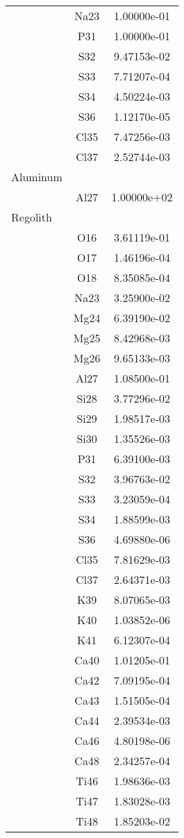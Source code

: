 \begin{centering}
\begin{longtable}{l c c}
& Na23 & 1.00000e-01 \\ 
& P31 & 1.00000e-01 \\ 
& S32 & 9.47153e-02 \\ 
& S33 & 7.71207e-04 \\ 
& S34 & 4.50224e-03 \\ 
& S36 & 1.12170e-05 \\ 
& Cl35 & 7.47256e-03 \\ 
& Cl37 & 2.52744e-03 \\ 
\hline
Aluminum & & \\
\hline
& Al27 & 1.00000e+02 \\ 
\hline
Regolith & & \\
\hline
& O16 & 3.61119e-01 \\ 
& O17 & 1.46196e-04 \\ 
& O18 & 8.35085e-04 \\ 
& Na23 & 3.25900e-02 \\ 
& Mg24 & 6.39190e-02 \\ 
& Mg25 & 8.42968e-03 \\ 
& Mg26 & 9.65133e-03 \\ 
& Al27 & 1.08500e-01 \\ 
& Si28 & 3.77296e-02 \\ 
& Si29 & 1.98517e-03 \\ 
& Si30 & 1.35526e-03 \\ 
& P31 & 6.39100e-03 \\ 
& S32 & 3.96763e-02 \\ 
& S33 & 3.23059e-04 \\ 
& S34 & 1.88599e-03 \\ 
& S36 & 4.69880e-06 \\ 
& Cl35 & 7.81629e-03 \\ 
& Cl37 & 2.64371e-03 \\ 
& K39 & 8.07065e-03 \\ 
& K40 & 1.03852e-06 \\ 
& K41 & 6.12307e-04 \\ 
& Ca40 & 1.01205e-01 \\ 
& Ca42 & 7.09195e-04 \\ 
& Ca43 & 1.51505e-04 \\ 
& Ca44 & 2.39534e-03 \\ 
& Ca46 & 4.80198e-06 \\ 
& Ca48 & 2.34257e-04 \\ 
& Ti46 & 1.98636e-03 \\ 
& Ti47 & 1.83028e-03 \\ 
& Ti48 & 1.85203e-02 \\ 

\end{longtable}
\end{centering}
